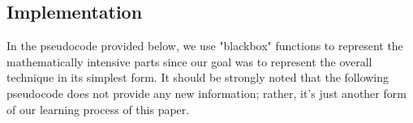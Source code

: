 																																																																																																																																											\subsection{Implementation}

																																																																																																																																											    In the pseudocode provided below, we use "blackbox" functions to represent the mathematically intensive parts since our goal was to represent the overall technique in its simplest form. It should be strongly noted that the following pseudocode does not provide any new information; rather, it's just another form of our learning process of this paper. \vspace{4mm}

